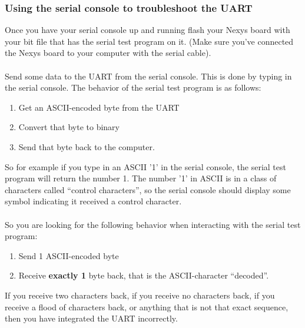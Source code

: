 \documentclass[notitlepage]{article}
\begin{document}
\subsubsection{Using the serial console to troubleshoot the UART}
Once you have your serial console up and running flash your Nexys board with your bit file that has the serial test program on it. (Make sure you've connected the Nexys board to your computer with the serial cable).\\\\
Send some data to the UART from the serial console. This is done by typing in the serial console. The behavior of the serial test program is as follows:
\begin{enumerate}
\item Get an ASCII-encoded byte from the UART
\item Convert that byte to binary
\item Send that byte back to the computer.
\end{enumerate}
So for example if you type in an ASCII '1' in the serial console, the serial test program will return the number 1. The number '1' in ASCII is in a class of characters called ``control characters'', so the serial console should display some symbol indicating it received a control character.\\\\
So you are looking for the following behavior when interacting with the serial test program:
\begin{enumerate}
\item Send 1 ASCII-encoded byte
\item Receive \textbf{exactly 1} byte back, that is the ASCII-character ``decoded''.
\end{enumerate}
If you receive two characters back, if you receive no characters back, if you receive a flood of characters back, or anything that is not that exact sequence, then you have integrated the UART incorrectly.
\end{document}
